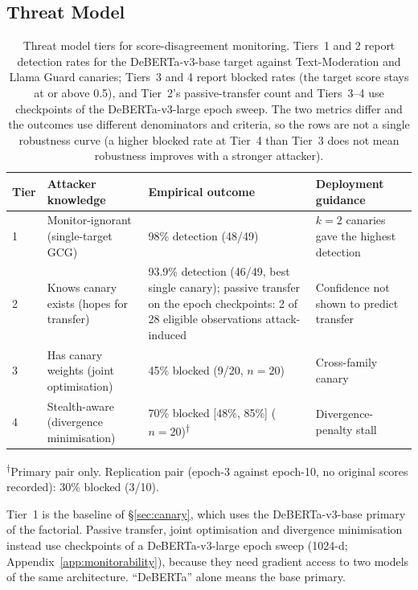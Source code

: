 \documentclass{article}
\begin{document}
\subsection{Threat Model}
\label{sec:threat-model}

\begin{table}[t]
\caption{Threat model tiers for score-disagreement monitoring. Tiers~1 and 2 report detection rates for the DeBERTa-v3-base target against Text-Moderation and Llama Guard canaries; Tiers~3 and 4 report blocked rates (the target score stays at or above 0.5), and Tier~2's passive-transfer count and Tiers~3--4 use checkpoints of the DeBERTa-v3-large epoch sweep. The two metrics differ and the outcomes use different denominators and criteria, so the rows are not a single robustness curve (a higher blocked rate at Tier~4 than Tier~3 does not mean robustness improves with a stronger attacker).}
\label{tab:threat-tiers}
\centering
\small
\begin{tabular}{lp{}p{}p{}}
\toprule
\textbf{Tier} & \textbf{Attacker knowledge} & \textbf{Empirical outcome} & \textbf{Deployment guidance} \\
\midrule
1 & Monitor-ignorant (single-target GCG) & 98\% detection (48/49) & $k{=}2$ canaries gave the highest detection \\
2 & Knows canary exists (hopes for transfer) & 93.9\% detection (46/49, best single canary); passive transfer on the epoch checkpoints: 2 of 28 eligible observations attack-induced & Confidence not shown to predict transfer \\
3 & Has canary weights (joint optimisation) & 45\% blocked (9/20, $n{=}20$) & Cross-family canary \\
4 & Stealth-aware (divergence minimisation) & 70\% blocked [48\%, 85\%] ($n{=}20$)\textsuperscript{$\dagger$} & Divergence-penalty stall \\
\bottomrule
\end{tabular}
\vspace{2pt}

{\footnotesize \textsuperscript{$\dagger$}Primary pair only. Replication pair (epoch-3 against epoch-10, no original scores recorded): 30\% blocked (3/10).}
\end{table}

Tier~1 is the baseline of \S\ref{sec:canary}, which uses the DeBERTa-v3-base primary of the factorial. Passive transfer, joint optimisation and divergence minimisation instead use checkpoints of a DeBERTa-v3-large epoch sweep (1024-d; Appendix~\ref{app:monitorability}), because they need gradient access to two models of the same architecture. ``DeBERTa'' alone means the base primary.
\end{document}
